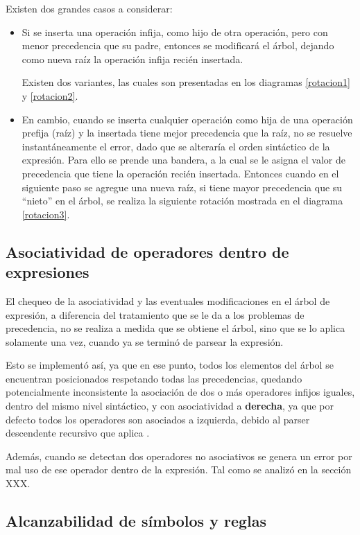 Existen dos grandes casos a considerar:
\begin{itemize}
\item Si se inserta una operación infija, como hijo de otra operación, pero con menor precedencia que su padre, entonces se modificará el árbol, dejando como nueva raíz la operación infija recién insertada. 

Existen dos variantes, las cuales son presentadas en los diagramas \ref{rotacion1} y \ref{rotacion2}.

\item En cambio, cuando se inserta cualquier operación como hija de una operación prefija (raíz) y la insertada tiene mejor precedencia que la raíz, no se resuelve instantáneamente el error, dado que se alteraría el orden sintáctico de la expresión. Para ello se prende una bandera, a la cual se le asigna el valor de precedencia que tiene la operación recién insertada. Entonces cuando en el siguiente paso se agregue una nueva raíz, si tiene mayor precedencia que su ``nieto'' en el árbol, se realiza la siguiente rotación mostrada en el diagrama \ref{rotacion3}.
\end{itemize}

\subsection{Asociatividad de operadores dentro de expresiones}

El chequeo de la asociatividad y las eventuales modificaciones en el árbol de expresión, a diferencia del tratamiento que se le da a los problemas de precedencia, no se realiza a medida que se obtiene el árbol, sino que se lo aplica solamente una vez, cuando ya se terminó de parsear la expresión.

Esto se implementó así, ya que en ese punto, todos los elementos del árbol se encuentran posicionados respetando todas las precedencias, quedando potencialmente inconsistente la asociación de dos o más operadores infijos iguales, dentro del mismo nivel sintáctico, y con asociatividad a \textbf{derecha}, ya que por defecto todos los operadores son asociados a izquierda, debido al parser descendente recursivo que aplica \spirit.

Además, cuando se detectan dos operadores no asociativos se genera un error por mal uso de ese operador dentro de la expresión. Tal como se analizó en la sección XXX.

\subsection{Alcanzabilidad de símbolos y reglas}

